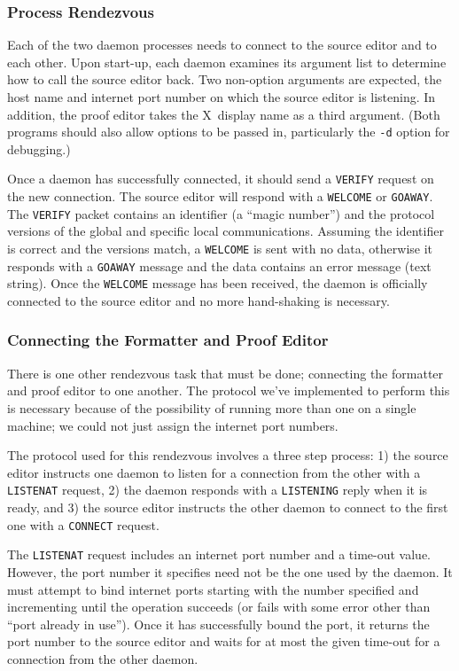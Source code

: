 \subsubsection{Process Rendezvous}

Each of the two daemon processes needs to connect to the source editor
and to each other.  Upon start-up, each daemon examines its argument
list to determine how to call the source editor back.  Two non-option
arguments are expected, the host name and internet port number on which
the source editor is listening.  In addition, the proof editor takes the
X~display name as a third argument.  (Both programs should also allow
options to be passed in, particularly the {\tt -d} option for debugging.)

Once a daemon has successfully connected, it should send a {\tt VERIFY}
request on the new connection.  The source editor will respond with a
{\tt WELCOME} or {\tt GOAWAY}.  The {\tt VERIFY} packet contains an
identifier (a ``magic number'') and the protocol versions of the global
and specific local communications.  Assuming the identifier is correct
and the versions match, a {\tt WELCOME} is sent with no data, otherwise
it responds with a {\tt GOAWAY} message and the data contains an error
message (text string).  Once the {\tt WELCOME} message has been received,
the daemon is officially connected to the source editor and no more
hand-shaking is necessary.

\subsubsection{Connecting the Formatter and Proof Editor}

There is one other rendezvous task that must be done; connecting the
formatter and proof editor to one another.  The protocol we've implemented
to perform this is necessary because of the possibility of running more
than one {\VorTeX} on a single machine; we could not just assign
the internet port numbers.

The protocol used for this rendezvous involves a three step process:
1) the source editor instructs one daemon to listen for a connection
from the other with a {\tt LISTENAT} request, 2) the daemon responds
with a {\tt LISTENING} reply when it is ready, and 3) the source editor
instructs the other daemon to connect to the first one with a
{\tt CONNECT} request.

The {\tt LISTENAT} request includes an internet port number and a
time-out value.  However, the port number it specifies need not be
the one used by the daemon.  It must attempt to bind internet ports
starting with the number specified and incrementing until the operation
succeeds (or fails with some error other than ``port already in use'').
Once it has successfully bound the port, it returns the port number to
the source editor and waits for at most the given time-out for a
connection from the other daemon.

